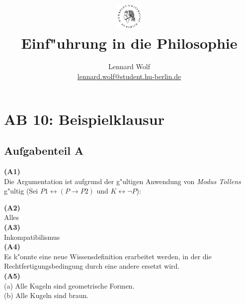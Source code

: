 \documentclass[a4paper]{article}
\date{\vspace{-3ex}}
\begin{document}
\title{
    \vspace{-30pt}
	\includegraphics*[width=0.1\textwidth,left]{images/hu_logo2.png}\\
	\vspace{-10pt}
	Einf"uhrung in die Philosophie}
\author{Lennard Wolf\\
        \small{\href{mailto:lennard.wolf@student.hu-berlin.de}{lennard.wolf@student.hu-berlin.de}}}
\maketitle
\vspace{0pt}

\section*{AB 10: Beispielklausur}
\large

\subsection*{Aufgabenteil A}

\noindent\textbf{(A1)}\\
\noindent Die Argumentation ist aufgrund der g"ultigen Anwendung von \emph{Modus Tollens} g"ultig (Sei $P1 \leftrightarrow (P\rightarrow P2)$ und $K \leftrightarrow \neg P$):
\begin{prooftree}
\end{prooftree}

\noindent\textbf{(A2)}\\
\noindent Alles\\

\noindent\textbf{(A3)}\\
\noindent Inkompatibilismus\\

\noindent\textbf{(A4)}\\
\noindent Es k"onnte eine neue Wissensdefinition erarbeitet werden, in der die Rechtfertigungsbedingung durch eine andere ersetzt wird.\\ 

\noindent\textbf{(A5)}\\
\noindent (a) Alle Kugeln sind geometrische Formen.\\
\noindent (b) Alle Kugeln sind braun.\\
\end{document}
